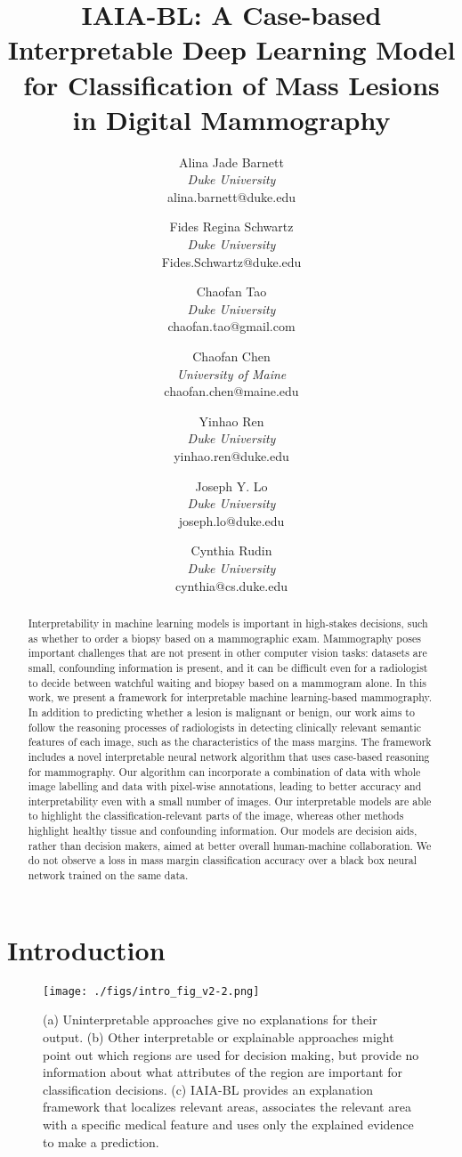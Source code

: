 \documentclass[11pt]{article}
\title{IAIA-BL: A Case-based Interpretable Deep Learning Model for Classification of Mass Lesions in Digital Mammography}
\author{
Alina Jade Barnett \\ 
\rowcolor{white} \textit{Duke University}\\
\rowcolor{white} alina.barnett@duke.edu \\
\and 
Fides Regina Schwartz \\
\rowcolor{white} \textit{Duke University}\\
\rowcolor{white} Fides.Schwartz@duke.edu \\
\and 
Chaofan Tao \\ 
\rowcolor{white} \textit{Duke University}\\
\rowcolor{white} chaofan.tao@gmail.com \\
\and 
Chaofan Chen \\
\rowcolor{white} \textit{University of Maine}\\
\rowcolor{white} chaofan.chen@maine.edu \\
\and
Yinhao Ren \\
\rowcolor{white} \textit{Duke University}\\
\rowcolor{white} yinhao.ren@duke.edu \\
\and
Joseph Y. Lo \\
\rowcolor{white} \textit{Duke University}\\
\rowcolor{white} joseph.lo@duke.edu \\
\and 
Cynthia Rudin \\
\rowcolor{white} \textit{Duke University}\\
\rowcolor{white} cynthia@cs.duke.edu \\}
\date{}
\begin{document}
\maketitle

\begin{abstract}

Interpretability in machine learning models is important in high-stakes decisions, such as whether to order a biopsy based on a mammographic exam. Mammography poses important challenges that are not present in other computer vision tasks: datasets are small, confounding information is present, and it can be difficult even for a radiologist to decide between watchful waiting and biopsy based on a mammogram alone. In this work, we present a framework for interpretable machine learning-based mammography.
In addition to predicting whether a lesion is malignant or benign, our work aims to follow the reasoning processes of radiologists in detecting clinically relevant semantic features of each image, such as the characteristics of the mass margins. The framework includes a novel interpretable neural network algorithm that uses case-based reasoning for mammography. Our algorithm can incorporate a combination of data with whole image labelling and data with pixel-wise annotations, leading to better accuracy and interpretability even with a small number of images. Our interpretable models are able to highlight the classification-relevant parts of the image, whereas other methods highlight healthy tissue and confounding information. Our models are decision aids, rather than decision makers, aimed at better overall human-machine collaboration. We do not observe a loss in mass margin classification accuracy over a black box neural network trained on the same data. 
\end{abstract}

\section{Introduction}

\begin{figure}
        \begin{center}
        \texttt{[image: ./figs/intro\_fig\_v2-2.png]}
        \end{center}
           \caption{(a) Uninterpretable approaches give no explanations for their output. (b) Other interpretable or explainable approaches might point out which regions are used for decision making, but provide no information about what attributes of the region are important for classification decisions. (c) IAIA-BL provides an explanation framework that localizes relevant areas, associates the relevant area with a specific medical feature and uses only the explained evidence to make a prediction. }
        \label{fig:intro_fig}
\end{figure}
\end{document}
